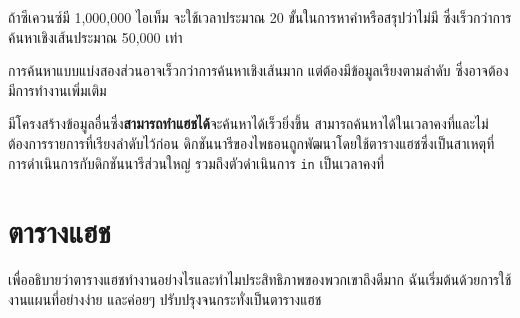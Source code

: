 
ถ้าซีเควนซ์มี 1,000,000 ไอเท็ม จะใช้เวลาประมาณ 20 ขั้นในการหาคำหรือสรุปว่าไม่มี ซึ่งเร็วกว่าการค้นหาเชิงเส้นประมาณ 50,000 เท่า


การค้นหาแบบแบ่งสองส่วนอาจเร็วกว่าการค้นหาเชิงเส้นมาก แต่ต้องมีข้อมูลเรียงตามลำดับ ซึ่งอาจต้องมีการทำงานเพิ่มเติม


มีโครงสร้างข้อมูลอื่นซึ่ง{\bf สามารถทำแฮชได้}จะค้นหาได้เร็วยิ่งขึ้น สามารถค้นหาได้ในเวลาคงที่และไม่ต้องการรายการที่เรียงลำดับไว้ก่อน 
ดิกชันนารีของไพธอนถูกพัฒนาโดยใช้ตารางแฮชซึ่งเป็นสาเหตุที่การดำเนินการกับดิกชันนารีส่วนใหญ่ รวมถึงตัวดำเนินการ {\tt in} เป็นเวลาคงที่


\section{ตารางแฮช} %
\label{hashtable}


เพื่ออธิบายว่าตารางแฮชทำงานอย่างไรและทำไมประสิทธิภาพของพวกเขาถึงดีมาก ฉันเริ่มต้นด้วยการใช้งานแผนที่อย่างง่าย และค่อยๆ ปรับปรุงจนกระทั่งเป็นตารางแฮช 



